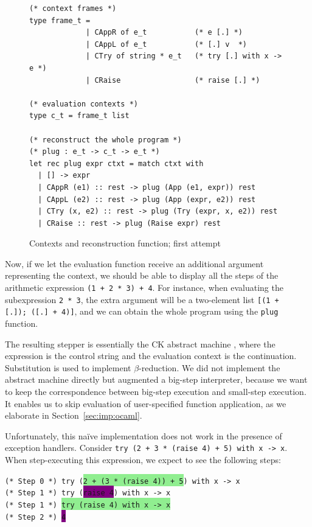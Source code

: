 \begin{figure}
\begin{verbatim}
(* context frames *)
type frame_t = 
             | CAppR of e_t           (* e [.] *)
             | CAppL of e_t           (* [.] v  *)
             | CTry of string * e_t   (* try [.] with x -> e *)
             | CRaise                 (* raise [.] *)

(* evaluation contexts *)
type c_t = frame_t list

(* reconstruct the whole program *)
(* plug : e_t -> c_t -> e_t *)
let rec plug expr ctxt = match ctxt with
  | [] -> expr
  | CAppR (e1) :: rest -> plug (App (e1, expr)) rest
  | CAppL (e2) :: rest -> plug (App (expr, e2)) rest
  | CTry (x, e2) :: rest -> plug (Try (expr, x, e2)) rest
  | CRaise :: rest -> plug (Raise expr) rest
\end{verbatim}
\caption{Contexts and reconstruction function; first attempt}
\label{figure:simpleplug}
\end{figure}

Now, if we let the evaluation function receive an additional argument representing the context, we should be able to display all the steps of the arithmetic expression \texttt{(1 + 2 * 3) + 4}.  For instance, when evaluating the subexpression \texttt{2 * 3}, the extra argument will be a two-element list \texttt{[(1 + [.]);\ ([.]\ + 4)]}, and we can obtain the whole program using the \texttt{plug} function.

The resulting stepper is essentially the CK abstract machine
\cite{FF1986}, where the expression is the control string and the
evaluation context is the continuation.
Substitution is used to implement $\beta$-reduction.
We did not implement the abstract machine directly but augmented a
big-step interpreter, because we want to keep the correspondence between
big-step execution and small-step execution.
It enables us to skip evaluation of user-specified function application,
as we elaborate in Section~\ref{sec:imp:ocaml}.

Unfortunately, this na\"ive implementation does not work in the presence of exception handlers.  Consider \texttt{try (2 + 3 * (raise 4) + 5) with x -> x}.  When step-executing this expression, we expect to see the following steps:

\vspace{0.2cm}

\noindent \texttt{(* Step 0 *) try (\colorbox{lightgreen}{2 + (3 * (raise 4)) + 5}) with x -> x\\
  (* Step 1 *) try (\colorbox{purple}{raise 4}) with x -> x\\
  (* Step 1 *) \colorbox{lightgreen}{try (raise 4) with x -> x}\\
  (* Step 2 *) \colorbox{purple}{4}\\
}

